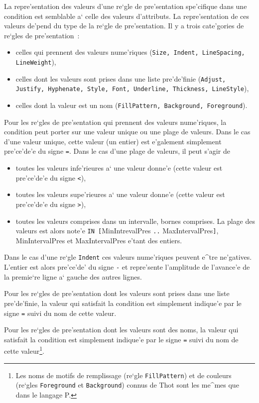 {La repre'sentation des valeurs d'une re`gle de pre'sentation spe'cifique
dans une condition est semblable a` celle des valeurs d'attributs.
La repre'sentation de ces valeurs de'pend du type de la re`gle de
pre'sentation. Il y a trois cate'gories de re`gles de pre'sentation~:
\begin{itemize}
\item
celles qui prennent des valeurs nume'riques ({\tt Size, Indent, LineSpacing, LineWeight}),
\item
celles dont les valeurs sont prises dans une liste pre'de'finie ({\tt Adjust,
Justify, Hyphenate, Style, Font, Underline, Thickness, LineStyle}),
\item
celles dont la valeur est un nom ({\tt FillPattern, Background, Foreground}).
\end{itemize}

Pour les re`gles de pre'sentation qui prennent des valeurs nume'riques,
la condition peut porter sur une valeur unique ou une plage de valeurs.
Dans le cas d'une valeur unique, cette valeur (un entier) est e'galement
simplement pre'ce'de'e du signe {\tt =}. Dans le cas d'une plage de
valeurs, il peut s'agir de
\begin{itemize}
\item
toutes les valeurs infe'rieures a` une valeur donne'e (cette valeur est
pre'ce'de'e du signe {\tt <}),
\item
toutes les valeurs supe'rieures a` une valeur donne'e (cette valeur est
pre'ce'de'e du signe {\tt >}),
\item
toutes les valeurs comprises dans un intervalle, bornes comprises. La plage
des valeurs est alors note'e {\tt IN [}MinIntrevalPres {\tt ..}
MaxIntervalPres{\tt]}, MinIntervalPres et MaxIntervalPres e'tant des entiers.
\end{itemize}
Dans le cas d'une re`gle {\tt Indent} ces valeurs nume'riques peuvent e^tre
ne'gatives. L'entier est alors pre'ce'de' du signe {\tt -} et repre'sente
l'amplitude de l'avance'e de la premie`re ligne a` gauche des autres lignes.

Pour les re`gles de pre'sentation dont les valeurs sont prises dans une
liste pre'de'finie, la valeur qui satisfait la condition est simplement
indique'e par le signe {\tt =} suivi du nom de cette valeur.

Pour les re`gles de pre'sentation dont les valeurs sont des noms, la valeur
qui satisfait la condition est simplement indique'e par le signe {\tt =}
suivi du nom de cette valeur\footnote{Les noms de motifs de remplissage
(re`gle {\tt FillPattern}) et de couleurs (re`gles {\tt Foreground} et
{\tt Background}) connus de Thot sont les me^mes que dans le langage P.}.

}
